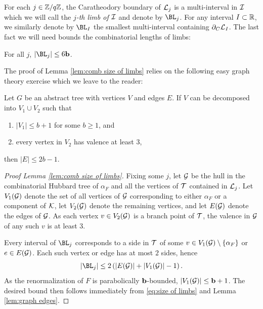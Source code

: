 \documentclass[12pt]{amsart}
\begin{document}
For each $j\in \mathbb Z/q\mathbb Z$, the Caratheodory boundary of $\mathcal L_j$ is a multi-interval in $\mathcal I$ which we will call the \textit{$j$-th limb of $\mathcal I$} and denote by $\BL_j$. For any interval $I\subset \mathbb R$, we similarly denote by $\BL_I$ the smallest multi-interval containing $\partial_C \mathcal L_I$. The last fact we will need bounds the combinatorial lengths of limbs:

\begin{lemma}\label{lem:comb size of limbs}
	For all $j$, $|\BL_j| \leq 6\bound$.
\end{lemma}

The proof of Lemma \ref{lem:comb size of limbs} relies on the following easy  graph theory exercise which we leave to the reader:

\begin{lem}\label{lem:graph edges}
	Let $G$ be an abstract tree with vertices $V$ and edges $E$. 
	If  $V$ can be decomposed into $V_1\cup V_2$ such that
	\begin{enumerate}
		\item $|V_1|\leq  b+1$ for some $b\geq 1$, and
		\item every vertex in $V_2$ has valence at least 3,
	\end{enumerate}
	then $|E| \leq 2b-1$.
\end{lem} 

\begin{proof}[Proof Lemma \ref{lem:comb size of limbs}]
	Fixing some $j$, let $\mathcal G$ be the hull in the combinatorial Hubbard tree of $\alpha_F$ and all the vertices of $\mathcal T$ contained in $\mathcal L_j$. 
	Let $V_1(\mathcal G)$ denote the set of all vertices of $\mathcal G$ corresponding to either $\alpha_F$ or a component of $\mathcal K$, 
	 let $V_2(\mathcal G)$ denote the remaining vertices, and let $E(\mathcal G)$ denote the edges of $\mathcal G$. As each vertex $v\in V_2(\mathcal G)$ is a branch point of $\mathcal T$, the valence in $\mathcal G$ of any such $v$ is at least 3.
	 
	 Every interval of $\BL_j$ corresponds to a side in $\mathcal T$ of some $v\in V_1(\mathcal G)\setminus \{\alpha_F\}$ or $e\in E(\mathcal G)$. Each such vertex or edge has at most $2$ sides, hence 
	 \begin{equation}\label{eq:size of limbs}
	 	|\BL_j|\leq 2\left(|E(\GG)| +|V_1(\GG)|-1\right).
	 \end{equation}
	 As the renormalization of $F$ is parabolically $\mathbf b$-bounded, $|V_1(\mathcal G)|\leq \mathbf b +1$. 
	 The desired bound then follows immediately from \eqref{eq:size of limbs} and Lemma \ref{lem:graph edges}.
	 \end{proof}
	 
\end{document}
